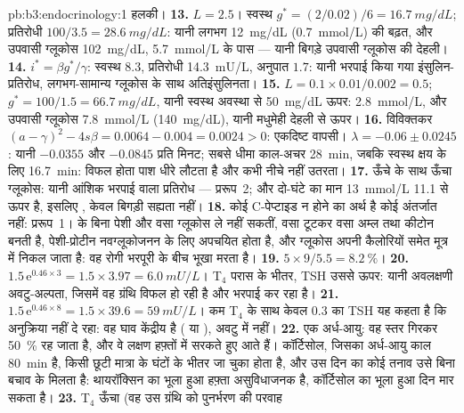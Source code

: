 \begin{solution}{pb:b3:endocrinology:1}
हलकी।
\textbf{13.} $L = 2.5$। स्वस्थ $g^{*} = (2/0.02)/6 = \qty{16.7}{mg/dL}$;
प्रतिरोधी $100/3.5 = \qty{28.6}{mg/dL}$: यानी लगभग
\qty{12}{mg/dL} (\qty{0.7}{mmol/L}) की बढ़त, और उपवासी ग्लूकोस
\qty{102}{mg/dL}, \qty{5.7}{mmol/L} के पास --- यानी बिगड़े उपवासी
ग्लूकोस की देहली।
\textbf{14.} $i^{*} = \beta g^{*}/\gamma$: स्वस्थ $8.3$, प्रतिरोधी
\qty{14.3}{mU/L}, अनुपात $1.7$: यानी भरपाई किया गया
इंसुलिन-प्रतिरोध, लगभग-सामान्य ग्लूकोस के साथ अतिइंसुलिनता।
\textbf{15.} $L = 0.1\times 0.01/0.002 = 0.5$; $g^{*} = 100/1.5 =
\qty{66.7}{mg/dL}$, यानी स्वस्थ अवस्था से \qty{50}{mg/dL} ऊपर:
\qty{2.8}{mmol/L}, और उपवासी ग्लूकोस \qty{7.8}{mmol/L} (\qty{140}{mg/dL}),
यानी मधुमेही देहली से ऊपर।
\textbf{16.} विविक्तकर $(a - \gamma)^{2} - 4s\beta = 0.0064 - 0.004 =
0.0024 > 0$: एकदिष्ट वापसी। $\lambda = -0.06 \pm 0.0245$: यानी $-0.0355$
और $-0.0845$ प्रति मिनट; सबसे धीमा काल-अचर \qty{28}{min}, जबकि स्वस्थ
क्षय के लिए \qty{16.7}{min}: विफल होता पाश धीरे लौटता है और कभी नीचे
नहीं उतरता।
\textbf{17.} ऊँचे  के साथ ऊँचा ग्लूकोस: यानी आंशिक भरपाई वाला
प्रतिरोध --- प्ररूप~2; और दो-घंटे का मान \qty{13}{mmol/L}
\qty{11.1}{} से ऊपर है, इसलिए , केवल बिगड़ी सह्यता नहीं।
\textbf{18.} कोई C-पेप्टाइड न होने का अर्थ है कोई अंतर्जात 
नहीं: प्ररूप~1।  के बिना पेशी और वसा ग्लूकोस ले नहीं सकतीं, वसा
टूटकर वसा अम्ल तथा कीटोन बनती है, पेशी-प्रोटीन नवग्लूकोजनन के लिए
अपचयित होता है, और ग्लूकोस अपनी कैलोरियों समेत मूत्र में निकल जाता है:
वह रोगी भरपूरी के बीच भूखा मरता है।
\textbf{19.} $5\times 9/5.5 = \qty{8.2}{\%}$।
\textbf{20.} $1.5\,\mathrm{e}^{0.46\times 3} = 1.5\times 3.97 =
\qty{6.0}{mU/L}$। T$_{4}$ परास के भीतर, TSH उससे ऊपर: यानी अवलक्षणी
अवटु-अल्पता, जिसमें वह ग्रंथि विफल हो रही है और  भरपाई कर रहा है।
\textbf{21.} $1.5\,\mathrm{e}^{0.46\times 8} = 1.5\times 39.6 =
\qty{59}{mU/L}$। कम T$_{4}$ के साथ केवल $0.3$ का TSH यह कहता है कि
 अनुक्रिया नहीं दे रहा: वह घाव केंद्रीय है ( या ),
अवटु में नहीं।
\textbf{22.} एक अर्ध-आयु: वह स्तर गिरकर \qty{50}{\%} रह जाता है, और वे
लक्षण हफ़्तों में सरकते हुए आते हैं। कॉर्टिसोल, जिसका अर्ध-आयु काल
\qty{80}{min} है, किसी छूटी मात्रा के घंटों के भीतर जा चुका होता है, और
उस दिन का कोई तनाव उसे बिना बचाव के मिलता है: थायरॉक्सिन का भूला हुआ
हफ़्ता असुविधाजनक है, कॉर्टिसोल का भूला हुआ दिन मार सकता है।
\textbf{23.} T$_{4}$ ऊँचा (वह  उस ग्रंथि को पुनर्भरण की परवाह

\end{solution}
